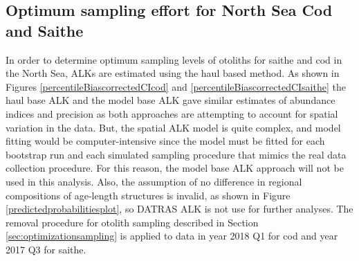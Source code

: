 \documentclass[a4paper 12pt]{article}
\numberwithin{equation}{section}
\begin{document}


\clearpage
\subsection{Optimum sampling effort for North Sea Cod and Saithe}
\label{sec:optimumeffortresults}
In order to determine optimum sampling levels of otoliths for saithe and cod in the North Sea, ALKs are estimated using the haul based  method. As shown in Figures \ref{percentileBiascorrectedCIcod} and \ref{percentileBiascorrectedCIsaithe} the haul base ALK and the model base ALK gave similar estimates of abundance indices and precision as both approaches are attempting to account for spatial variation in the data. But, the spatial ALK model is  quite complex, and model fitting would be computer-intensive since the model must be fitted for each bootstrap run and each simulated sampling procedure that mimics the real data collection procedure. For this reason, the model base ALK approach will not be used in this analysis. Also, the assumption of no difference in regional compositions of age-length structures is invalid,  as shown in Figure \ref{predictedprobabilitiesplot},  so DATRAS ALK is not use for further analyses. The removal procedure for otolith sampling described in Section \ref{sec:optimizationsampling} is applied to data in year 2018 Q1 for cod and year 2017 Q3 for saithe.
\end{document}
